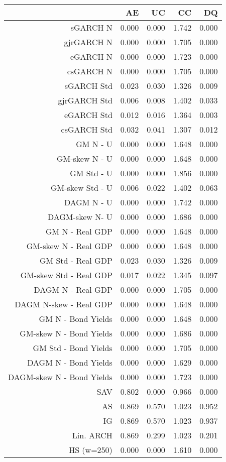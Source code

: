 \documentclass{article}
\begin{document}


\begin{table}[ht]
\centering
\begin{tabular}{rrrrr}
  \hline
 & AE & UC & CC & DQ \\ 
  \hline
sGARCH N & 0.000 & 0.000 & 1.742 & 0.000 \\ 
  gjrGARCH N & 0.000 & 0.000 & 1.705 & 0.000 \\ 
  eGARCH N & 0.000 & 0.000 & 1.723 & 0.000 \\ 
  csGARCH N & 0.000 & 0.000 & 1.705 & 0.000 \\ 
  sGARCH Std & 0.023 & 0.030 & 1.326 & 0.009 \\ 
  gjrGARCH Std & 0.006 & 0.008 & 1.402 & 0.033 \\ 
  eGARCH Std & 0.012 & 0.016 & 1.364 & 0.003 \\ 
  csGARCH Std & 0.032 & 0.041 & 1.307 & 0.012 \\ 
  GM N - U & 0.000 & 0.000 & 1.648 & 0.000 \\ 
  GM-skew N - U & 0.000 & 0.000 & 1.648 & 0.000 \\ 
  GM Std - U & 0.000 & 0.000 & 1.856 & 0.000 \\ 
  GM-skew Std - U & 0.006 & 0.022 & 1.402 & 0.063 \\ 
  DAGM N - U & 0.000 & 0.000 & 1.742 & 0.000 \\ 
  DAGM-skew  N- U & 0.000 & 0.000 & 1.686 & 0.000 \\ 
  GM N - Real GDP & 0.000 & 0.000 & 1.648 & 0.000 \\ 
  GM-skew N - Real GDP & 0.000 & 0.000 & 1.648 & 0.000 \\ 
  GM Std - Real GDP & 0.023 & 0.030 & 1.326 & 0.009 \\ 
  GM-skew Std - Real GDP & 0.017 & 0.022 & 1.345 & 0.097 \\ 
  DAGM N - Real GDP & 0.000 & 0.000 & 1.705 & 0.000 \\ 
  DAGM N-skew - Real GDP & 0.000 & 0.000 & 1.648 & 0.000 \\ 
  GM N - Bond Yields & 0.000 & 0.000 & 1.648 & 0.000 \\ 
  GM-skew N - Bond Yields & 0.000 & 0.000 & 1.686 & 0.000 \\ 
  GM Std - Bond Yields & 0.000 & 0.000 & 1.705 & 0.000 \\ 
  DAGM N - Bond Yields & 0.000 & 0.000 & 1.629 & 0.000 \\ 
  DAGM-skew N - Bond Yields & 0.000 & 0.000 & 1.723 & 0.000 \\ 
  SAV & 0.802 & 0.000 & 0.966 & 0.000 \\ 
  AS & 0.869 & 0.570 & 1.023 & 0.952 \\ 
  IG & 0.869 & 0.570 & 1.023 & 0.937 \\ 
  Lin. ARCH & 0.869 & 0.299 & 1.023 & 0.201 \\ 
  HS (w=250) & 0.000 & 0.000 & 1.610 & 0.000 \\ 
   \hline
\end{tabular}
\end{table}
\end{document}
